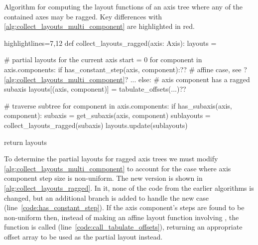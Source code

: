 \documentclass[thesis]{subfiles}
\begin{document}
\begin{algorithm}
  \caption{
    Algorithm for computing the layout functions of an axis tree where any of the contained axes may be ragged.
    Key differences with \cref{alg:collect_layouts_multi_component} are highlighted in red.
  }

  \begin{center}
    \begin{minipage}{.9\textwidth}
      \begin{pyalg2*}{highlightlines={7,12}}
        def collect_layouts_ragged(axis: Axis):
          layouts = {}

          # partial layouts for the current axis
          start = 0
          for component in axis.components:
            if has_constant_step(axis, component):?\label{code:has_constant_step}?
              # affine case, see ?\cref{alg:collect_layouts_multi_component}?
              ...
            else:
              # axis component has a ragged subaxis
              layouts[(axis, component)] = tabulate_offsets(...)?\label{code:call_tabulate_offsets}?

          # traverse subtree
          for component in axis.components:
            if has_subaxis(axis, component): 
              subaxis = get_subaxis(axis, component)
              sublayouts = collect_layouts_ragged(subaxis)
              layouts.update(sublayouts)

          return layouts
      \end{pyalg2*}
    \end{minipage}
  \end{center}
  \label{alg:collect_layouts_ragged}
\end{algorithm}

To determine the partial layouts for ragged axis trees we must modify \cref{alg:collect_layouts_multi_component} to account for the case where axis component step size is non-uniform.
The new version is shown in \cref{alg:collect_layouts_ragged}.
In it, none of the code from the earlier algorithms is changed, but an additional branch is added to handle the new case (line~\ref{code:has_constant_step}).
If the axis component's steps are found to be non-uniform then, instead of making an affine layout function involving , the function  is called (line~\ref{code:call_tabulate_offsets}), returning an appropriate offset array to be used as the partial layout instead.
\end{document}
